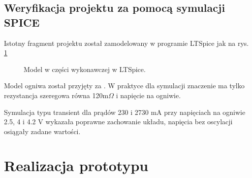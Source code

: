 \documentclass[polish,engineer]{polsl-msth}
\begin{document}
\section{Weryfikacja projektu za pomocą symulacji SPICE}
Istotny fragment projektu został zamodelowany w programie LTSpice jak na rys. \ref{img:modelLTv1}
\begin{figure}[hbtp]
\centering
     \caption{Model w części wykonawczej w LTSpice. \label{img:modelLTv1}}
\end{figure}
Model ogniwa został przyjęty za \cite{8759769_cellmodel1storder}. W praktyce dla symulacji znaczenie ma tylko rezystancja szeregowa równa 120m$\Omega$ i napięcie na ogniwie.

Symulacja typu transient dla prądów 230 i 2730 mA przy napięciach na ogniwie 2.5, 4 i 4.2 V wykazała poprawne zachowanie układu, napięcia bez oscylacji osiągały zadane wartości.

\chapter{Realizacja prototypu}
\end{document}
